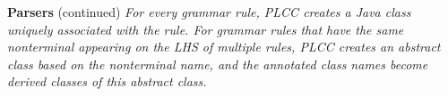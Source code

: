 \begin{minipage}[t]{\sw}
\slidenumber
\LARGE
{\bf Parsers} (continued)\exx
{\em
For every grammar rule,
PLCC creates a Java class uniquely associated with the rule.
For grammar rules that have the same nonterminal appearing
on the LHS of multiple rules,
PLCC creates an abstract class based on the nonterminal name,
and the annotated class names become derived classes of this abstract class.}
\end{minipage}
\clearpage
